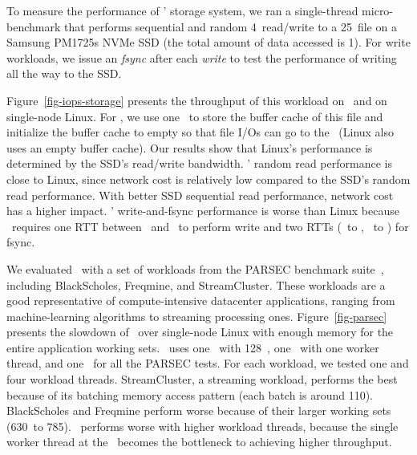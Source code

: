 To measure the performance of \lego' storage system, we ran a single-thread micro-benchmark 
that performs sequential and random 4\KB\ read/write to a 25\GB\ file on a Samsung PM1725s NVMe SSD (the total amount of data accessed is 1\GB).
For write workloads, we issue an {\em fsync} after each {\em write} to test the performance of writing all the way to the SSD.

Figure~\ref{fig-iops-storage} presents the throughput of this workload on \lego\ and on single-node Linux.
For \lego, we use one \mcomponent\ to store the buffer cache of this file and initialize the buffer cache to empty
so that file I/Os can go to the \scomponent\ (Linux also uses an empty buffer cache).
Our results show that Linux's performance is determined by the SSD's read/write bandwidth.
\lego' random read performance is close to Linux, since network cost is relatively low compared to the SSD's random read performance.
With better SSD sequential read performance, network cost has a higher impact.
\lego' write-and-fsync performance is worse than Linux because
\lego\ requires one RTT between \pcomponent\ and \mcomponent\ to perform write 
and two RTTs (\pcomponent\ to \mcomponent, \mcomponent\ to \scomponent) for fsync.

We evaluated \lego\ with a set of workloads from the PARSEC benchmark suite~\cite{PARSEC},
including BlackScholes, Freqmine, and StreamCluster.
These workloads are a good representative of compute-intensive datacenter applications, 
ranging from machine-learning algorithms to streaming processing ones.
Figure~\ref{fig-parsec} presents the slowdown of \lego\ 
over single-node Linux with enough memory for the entire application working sets.
\lego\ uses one \pcomponent\ with 128\MB\ \excache,
one \mcomponent\ with one worker thread, and one \scomponent\ for all the PARSEC tests.
For each workload, we tested one and four workload threads.
StreamCluster, a streaming workload, performs the best because of its 
batching memory access pattern (each batch is around 110\MB).
BlackScholes and Freqmine perform worse because of their larger working sets (630\MB\ to 785\MB).
\lego\ performs worse with higher workload threads, 
because the single worker thread at the \mcomponent\ becomes the bottleneck to achieving higher throughput.

